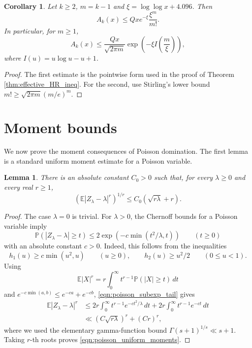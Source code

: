 \documentclass[12pt,a4paper,reqno]{amsart}
\theoremstyle{plain}
\newtheorem{lmm}[thrm]{Lemma}
\newtheorem{crllry}[thrm]{Corollary}
\numberwithin{sblmm}{thrm}
\numberwithin{equation}{section}
\begin{document}
\begin{crllry}\label{cor:local_profile}
    Let $k\ge 2$, $m=k-1$ and $\xi=\log\log x+4.096$. Then
    \begin{equation}\label{eqn:local_poisson_profile}
        A_k(x)\le Qxe^{-\xi}\frac{\xi^m}{m!}.
    \end{equation}
    In particular, for $m\ge 1$,
    \begin{equation}\label{eqn:local_large_deviation}
        A_k(x)\le\frac{Qx}{\sqrt{2\pi m}}\exp\left(-\xi I\left(\frac{m}{\xi}\right)\right),
    \end{equation}
    where $I(u)=u\log u-u+1$.
\end{crllry}
\begin{proof}
    The first estimate is the pointwise form used in the proof of Theorem \ref{thm:effective_HR_ineq}. For the second, use Stirling's lower bound $m!\ge\sqrt{2\pi m}(m/e)^m$.
\end{proof}

\section{Moment bounds}
We now prove the moment consequences of Poisson domination. The first lemma is a standard uniform moment estimate for a Poisson variable.

\begin{lmm}\label{lem:poisson_uniform_moments}
    There is an absolute constant $C_0>0$ such that, for every $\lambda\ge 0$ and every real $r\ge 1$,
    \begin{equation}\label{eqn:poisson_uniform_moments}
        \left(\mathbb{E}|Z_{\lambda}-\lambda|^r\right)^{1/r}\le C_0(\sqrt{r\lambda}+r).
    \end{equation}
\end{lmm}
\begin{proof}
    The case $\lambda=0$ is trivial. For $\lambda>0$, the Chernoff bounds for a Poisson variable imply
    \begin{equation}\label{eqn:poisson_subexp_tail}
        \mathbb{P}(|Z_{\lambda}-\lambda|\ge t)\le 2\exp(-c\min(t^2/\lambda,t))\qquad (t\ge 0)
    \end{equation}
    with an absolute constant $c>0$. Indeed, this follows from the inequalities
    $$h_1(u)\ge c\min(u^2,u)\qquad (u\ge 0),\qquad h_2(u)\ge u^2/2\qquad (0\le u<1).$$
    Using
    $$\mathbb{E}|X|^r=r\int_0^{\infty}t^{r-1}\mathbb{P}(|X|\ge t)\,dt$$
    and $e^{-c\min(a,b)}\le e^{-ca}+e^{-cb}$, \eqref{eqn:poisson_subexp_tail} gives
    \begin{align*}
        \mathbb{E}|Z_{\lambda}-\lambda|^r&\le 2r\int_0^{\infty}t^{r-1}e^{-ct^2/\lambda}\,dt+2r\int_0^{\infty}t^{r-1}e^{-ct}\,dt\\
        &\ll (C\sqrt{r\lambda})^r+(Cr)^r,
    \end{align*}
    where we used the elementary gamma-function bound $\Gamma(s+1)^{1/s}\ll s+1$. Taking $r$-th roots proves \eqref{eqn:poisson_uniform_moments}.
\end{proof}
\end{document}
